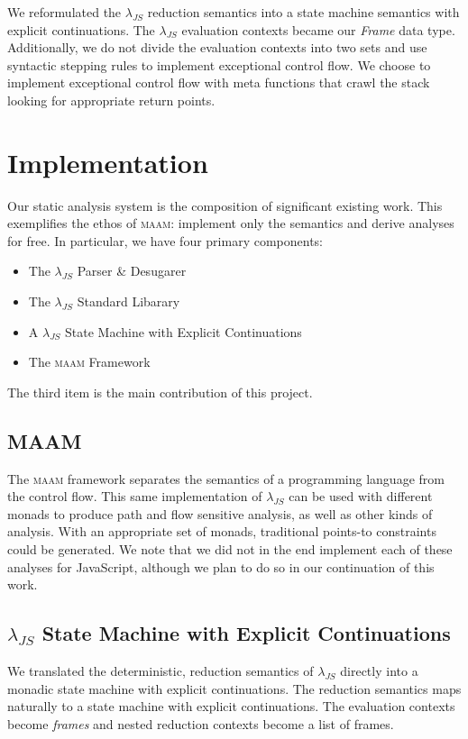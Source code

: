 \documentclass[10pt,letter,english]{article}
\newcommand{\maam}[0]{\textsc{maam}}
\newcommand{\js}[0]{JavaScript}
\newcommand{\lambdajs}[0]{$\lambda_{JS}$}
\begin{document}
We reformulated the \lambdajs{} reduction semantics into a state machine
semantics with explicit continuations. The \lambdajs{} evaluation contexts
became our \emph{Frame} data type. Additionally, we do not divide the
evaluation contexts into two sets and use syntactic stepping rules to implement
exceptional control flow. We choose to implement exceptional control flow with
meta functions that crawl the stack looking for appropriate return points.

\section{Implementation}

Our static analysis system is the composition of significant existing work. This
exemplifies the ethos of \maam{}: implement only the semantics and derive
analyses for free. In particular, we have four primary components:

\begin{itemize}
\item The \lambdajs{} Parser \& Desugarer
\item The \lambdajs{} Standard Libarary
\item A \lambdajs{} State Machine with Explicit Continuations
\item The \maam{} Framework
\end{itemize}

The third item is the main contribution of this project.

\subsection{MAAM}

The \maam{} framework separates the semantics of a programming language from the
control flow. This same implementation of \lambdajs{} can be used with different
monads to produce path and flow sensitive analysis, as well as other kinds of
analysis. With an appropriate set of monads, traditional points-to constraints
could be generated. We note that we did not in the end implement each of these
analyses for \js{}, although we plan to do so in our continuation of this work.

\subsection{\lambdajs{} State Machine with Explicit Continuations}

We translated the deterministic, reduction semantics of \lambdajs{} directly
into a monadic state machine with explicit continuations. The reduction
semantics maps naturally to a state machine with explicit continuations. The
evaluation contexts become \emph{frames} and nested reduction contexts become a
list of frames.
\end{document}
